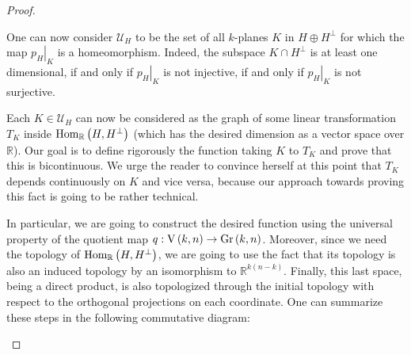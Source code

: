 \begin{proof}
\begin{b_item}
One can now consider $\mathcal{U}_H$ to be the set of all $k$-planes $K$ in $H\oplus H^{\perp}$ for which the map $\left.p_H\right|_{K}$ is a homeomorphism. Indeed, the subspace $K\cap H^{\perp}$ is at least one dimensional, if and only if $\left.p_H\right|_K$ is not injective, if and only if $\left.p_H\right|_K$ is not surjective.

Each $K\in\mathcal{U}_H$ can now be considered as the graph of some linear transformation $T_K$ inside $\mathrm{Hom}_{\mathbb{R}}\left(H,H^{\perp}\right)$ (which has the desired dimension as a vector space over $\mathbb{R}$). Our goal is to define rigorously the function taking $K$ to $T_K$ and prove that this is bicontinuous. We urge the reader to convince herself at this point that $T_K$ depends continuously on $K$ and vice versa, because our approach towards proving this fact is going to be rather technical.

In particular, we are going to construct the desired function using the universal property of the quotient map $q:\St{k}{n}\to\Gr{k}{n}$. Moreover, since we need the topology of $\mathrm{Hom}_{\mathbb{R}}\left(H,H^{\perp}\right)$, we are going to use the fact that its topology is also an induced topology by an isomorphism to $\mathbb{R}^{k(n-k)}$. Finally, this last space, being a direct product, is also topologized through the initial topology with respect to the orthogonal projections on each coordinate. One can summarize these steps in the following commutative diagram:

\begin{center}
\end{center}


\end{b_item}
\end{proof}
